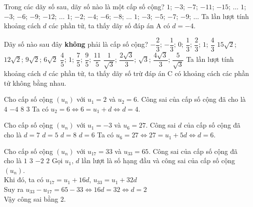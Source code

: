 \begin{ex}%
Trong các dãy số sau, dãy số nào là một cấp số cộng?
\choice
{\True $ 1 $; $ -3 $; $ -7 $; $ -11 $; $ -15 $; $ \ldots $}
{$ 1 $; $ -3 $; $ -6 $; $ -9 $; $ -12 $; $ \ldots $}
{$ 1 $; $ -2 $; $ -4 $; $ -6 $; $ -8 $; $ \ldots $}
{$ 1 $; $ -3 $; $ -5 $; $ -7 $; $ -9 $; $ \ldots $}
\loigiai
{
	Ta lần lượt tính khoảng cách $ d $ các phần tử, ta thấy dãy số đáp án A có $ d= -4$.
}
\end{ex}
\begin{ex}%
Dãy số nào sau đây \textbf{không} phải là cấp số cộng?
\choice
{$ -\dfrac{2}{3} $; $ -\dfrac{1}{3} $; $ 0 $; $ \dfrac{1}{3} $; $ \dfrac{2}{3} $; $ 1 $; $ \dfrac{4}{3} $}
{$ 15\sqrt{2} $; $ 12\sqrt{2} $; $ 9\sqrt{2} $; $ 6\sqrt{2} $}
{\True $ \dfrac{4}{5} $; $ 1 $; $ \dfrac{7}{5} $; $ \dfrac{9}{5} $; $ \dfrac{11}{5} $}
{$ \dfrac{1}{\sqrt{3}} $; $ \dfrac{2\sqrt{3}}{3} $; $ \sqrt{3} $; $ \dfrac{4\sqrt{3}}{3} $; $ \dfrac{5}{\sqrt{3}} $}
\loigiai
{
	Ta lần lượt tính khoảng cách $ d $ các phần tử, ta thấy dãy số trừ đáp án C có khoảng cách các phần tử không bằng nhau.
}
\end{ex}
\begin{ex}%
Cho cấp số cộng $ (u_n) $ với $ u_1=2 $ và $ u_2=6 $. Công sai của cấp số cộng đã cho là	
\choice
{\True $ 4 $}
{$ -4 $}
{$ 8 $}
{$ 3 $}
\loigiai
{
	Ta có $ u_2=6 \Leftrightarrow 6=u_1+d \Leftrightarrow d=4 $.
}
\end{ex}
\begin{ex}%
Cho cấp số cộng $ (u_n) $ với $ u_1=-3 $ và $ u_6=27 $. Công sai $ d $ của cấp số cộng đã cho là	
\choice
{$ d=7 $}
{$ d=5 $}
{$ d=8 $}
{\True $ d=6 $}
\loigiai
{
	Ta có $ u_6=27 \Leftrightarrow 27=u_1+5d \Leftrightarrow d=6 $.
}
\end{ex}
\begin{ex}%
Cho cấp số cộng $ (u_n) $ với $ u_{17}=33 $ và $ u_{33}=65 $. Công sai của cấp số cộng đã cho là	
\choice
{$ 1 $}
{$ 3 $}
{$ -2 $}
{\True $ 2 $}
\loigiai
{
	Gọi $ u_1 $, $ d $ lần lượt là số hạng đầu và công sai của cấp số cộng $ (u_n) $.\\
	Khi đó, ta có $ u_{17}=u_1+16d $, $ u_{33}=u_1+32d $\\
	Suy ra $ u_{33}-u_{17}=65-33 \Leftrightarrow 16d=32 \Leftrightarrow d=2 $\\
	Vậy công sai bằng $ 2 $.
}
\end{ex}
